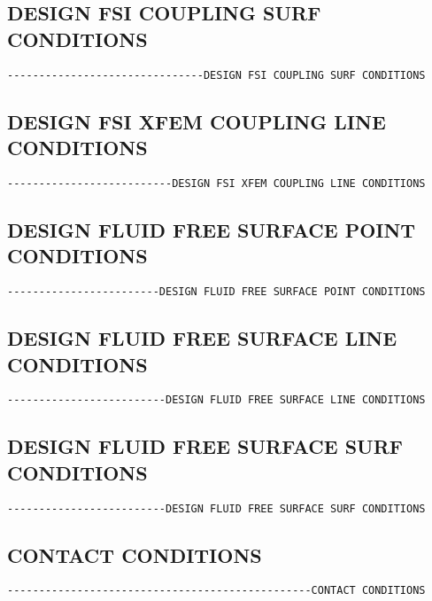 \subsection{DESIGN FSI COUPLING SURF CONDITIONS}
\begin{verbatim}
-------------------------------DESIGN FSI COUPLING SURF CONDITIONS
\end{verbatim}


\subsection{DESIGN FSI XFEM COUPLING LINE CONDITIONS}
\begin{verbatim}
--------------------------DESIGN FSI XFEM COUPLING LINE CONDITIONS
\end{verbatim}


\subsection{DESIGN FLUID FREE SURFACE POINT CONDITIONS}
\begin{verbatim}
------------------------DESIGN FLUID FREE SURFACE POINT CONDITIONS
\end{verbatim}


\subsection{DESIGN FLUID FREE SURFACE LINE CONDITIONS}
\begin{verbatim}
-------------------------DESIGN FLUID FREE SURFACE LINE CONDITIONS
\end{verbatim}


\subsection{DESIGN FLUID FREE SURFACE SURF CONDITIONS}
\begin{verbatim}
-------------------------DESIGN FLUID FREE SURFACE SURF CONDITIONS
\end{verbatim}


\subsection{CONTACT CONDITIONS}
\begin{verbatim}
------------------------------------------------CONTACT CONDITIONS
\end{verbatim}


